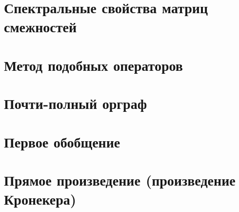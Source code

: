\section*{Спектральные свойства матриц смежностей}

\section*{Метод подобных операторов}

\section*{Почти-полный орграф}

\section*{Первое обобщение}

\section*{Прямое произведение (произведение Кронекера)}

